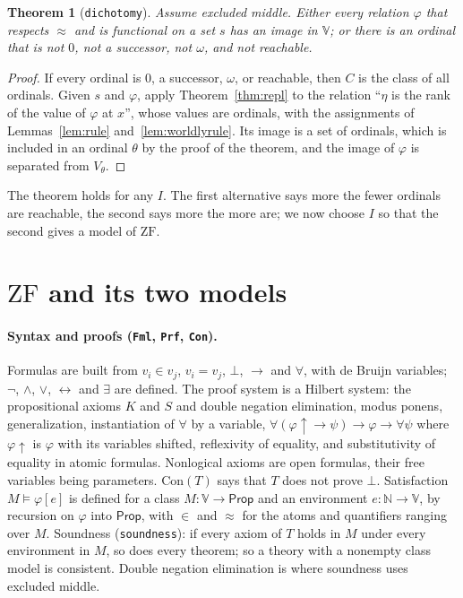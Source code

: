 \documentclass[10pt]{article}
\newtheorem{theorem}{Theorem}[section]
\theoremstyle{definition}
\theoremstyle{remark}
\newcommand{\N}{\mathbb{N}}
\newcommand{\Prop}{\mathsf{Prop}}
\newcommand{\ZF}{\mathrm{ZF}}
\newcommand{\Con}{\mathrm{Con}}
\newcommand{\V}{\mathbb{V}}
\newcommand{\lean}[1]{\texttt{#1}}
\begin{document}
\begin{theorem}[\lean{dichotomy}]\label{thm:dich}
Assume excluded middle. Either every relation $\varphi$ that respects $\approx$ and
is functional on a set $s$ has an image in $\V$; or there is an ordinal
that is not $0$, not a successor, not $\omega$, and not reachable.
\end{theorem}
\begin{proof}
If every ordinal is $0$, a successor, $\omega$, or reachable, then $C$ is
the class of all ordinals. Given $s$ and $\varphi$, apply
Theorem~\ref{thm:repl} to the relation ``$\eta$ is the rank of the value of
$\varphi$ at $x$'', whose values are ordinals, with the assignments of
Lemmas~\ref{lem:rule} and~\ref{lem:worldlyrule}. Its image is a set of
ordinals, which is included in an ordinal $\theta$ by the proof of the
theorem, and the image of $\varphi$ is separated from $V_\theta$.
\end{proof}

The theorem holds for any $I$. The first alternative says more the
fewer ordinals are reachable, the second says more the more are; we now
choose $I$ so that the second gives a model of $\ZF$.

\section{\texorpdfstring{$\ZF$}{ZF} and its two models}\label{sec:zf}

\paragraph{Syntax and proofs (\lean{Fml}, \lean{Prf}, \lean{Con}).}
Formulas are built from $v_i\in v_j$, $v_i=v_j$, $\bot$, $\to$ and $\forall$,
with de Bruijn variables; $\neg$, $\wedge$, $\vee$, $\leftrightarrow$ and $\exists$ are
defined. The proof system is a Hilbert system: the propositional axioms
$K$ and $S$ and double negation elimination, modus ponens,
generalization, instantiation of $\forall$ by a variable,
$\forall(\varphi{\uparrow}\to\psi)\to\varphi\to\forall\psi$ where $\varphi{\uparrow}$ is $\varphi$ with its
variables shifted, reflexivity of equality, and substitutivity of
equality in atomic formulas. Nonlogical axioms are open formulas, their
free variables being parameters. $\Con(T)$ says that $T$ does not prove
$\bot$. Satisfaction $M\models\varphi[e]$ is defined for a class $M:\V\to\Prop$
and an environment $e:\N\to\V$, by recursion on $\varphi$ into $\Prop$, with
$\in$ and $\approx$ for the atoms and quantifiers ranging over $M$. Soundness
(\lean{soundness}): if every axiom of $T$ holds in $M$ under every
environment in $M$, so does every theorem; so a theory with a nonempty
class model is consistent. Double negation elimination is where
soundness uses excluded middle.
\end{document}
